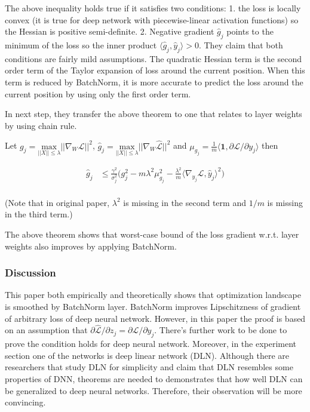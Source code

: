 \documentclass{article}
\begin{document}
The above inequality holds true if it satisfies two conditions: 1. the loss is locally convex (it is true for deep network with piecewise-linear activation functions) so the Hessian is positive semi-definite. 2. Negative gradient $\hat{g}_j$ points to the minimum of the loss so the inner product $\langle\hat{g}_j,\hat{y}_j\rangle>0$. They claim that both conditions are fairly mild assumptions. The quadratic Hessian term is the second order term of the Taylor expansion of loss around the current position. When this term is reduced by BatchNorm, it is more accurate to predict the loss around the current position by using only the first order term.

In next step, they transfer the above theorem to one that relates to layer weights by using chain rule.

Let $g_j=\underset{||X||\leq\lambda}{\mathrm{max}}\big|\big|\nabla_W\mathcal{L}\big|\big|^2$, $\hat{g}_j=\underset{||X||\leq\lambda}{\mathrm{max}}\big|\big|\nabla_W\hat{\mathcal{L}}\big|\big|^2$ and $\mu_{g_j}=\frac{1}{m}\langle\mathbf{1},\partial\mathcal{L}/\partial y_j\rangle$ then

\begin{align*}
	\hat{g}_j &\leq 
	\frac{\gamma^2}{\sigma_j^2}\Bigg(
	g_j^2 - m\lambda^2\mu^2_{g_j}-\frac{\lambda^2}{m}\langle\nabla_{y_j}\mathcal{L},\hat{y}_j\rangle^2
	\Bigg)\\
\end{align*}

(Note that in original paper, $\lambda^2$ is missing in the second term and $1/m$ is missing in the third term.)

The above theorem shows that worst-case bound of the loss gradient w.r.t. layer weights also improves by applying BatchNorm.

\subsubsection{Discussion}

This paper both empirically and theoretically shows that optimization landscape is smoothed by BatchNorm layer. BatchNorm improves Lipschitzness of gradient of arbitrary loss of deep neural network. However, in this paper the proof is based on an assumption that $\partial\hat{\mathcal{L}}/\partial z_j = \partial\mathcal{L}/\partial y_j$. There's further work to be done to prove the condition holds for deep neural network. Moreover, in the experiment section one of the networks is deep linear network (DLN). Although there are researchers that study DLN for simplicity and claim that DLN resembles some properties of DNN, theorems are needed to demonstrates that how well DLN can be generalized to deep neural networks. Therefore, their observation will be more convincing.
\end{document}
